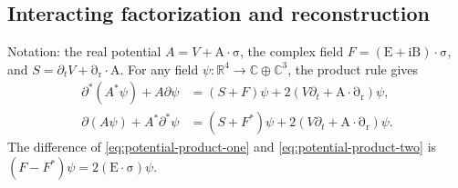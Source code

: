 \documentclass[11pt]{article}
\newcommand{\pv}[1]{{#1}}
\newcommand{\pvGreek}[1]{{#1}}
\newcommand{\vstyle}[1]{{\bm{\mathrm{#1}}}}
\newcommand{\pA}{\pv{A}}
\newcommand{\pF}{\pv{F}}
\newcommand{\pvpartial}{\pvGreek{\partial}}
\newcommand{\pvpsi}{\pvGreek{\psi}}
\numberwithin{equation}{section}
\newcommand{\R}{\mathbb{R}}
\newcommand{\C}{\mathbb{C}}
\newcommand{\ii}{\mathrm{i}}
\newcommand{\dotprod}{\cdot}
\newcommand{\bsig}{\vstyle{\sigma}}
\newcommand{\bA}{\vstyle{A}}
\newcommand{\br}{\vstyle{r}}
\newcommand{\bE}{\vstyle{E}}
\newcommand{\bBf}{\vstyle{B}}
\newcommand{\pdr}{\vstyle{\partial}_{\br}}
\begin{document}
\subsection{Interacting factorization and reconstruction}
\label{sec:interacting-factorization}

Notation: the real potential $\pA=V+\bA\dotprod\bsig$, the complex field
$\pF=(\bE+\ii\bBf)\dotprod\bsig$, and
$S=\partial_tV+\pdr\dotprod\bA$.
For any field $\pvpsi:\R^4\to\C\oplus\C^3$, the product rule gives
\begin{align}
 \pvpartial^*(\pA^*\pvpsi)+\pA\pvpartial\pvpsi
 &=(S+\pF)\pvpsi+2(V\partial_t+\bA\dotprod\pdr)\pvpsi,
 \label{eq:potential-product-one}\\
 \pvpartial(\pA\pvpsi)+\pA^*\pvpartial^*\pvpsi
 &=(S+\pF^*)\pvpsi+2(V\partial_t+\bA\dotprod\pdr)\pvpsi.
 \label{eq:potential-product-two}
\end{align}
The difference of \eqref{eq:potential-product-one} and
\eqref{eq:potential-product-two} is $(\pF-\pF^*)\pvpsi=2(\bE\dotprod\bsig)\pvpsi$.
\end{document}
